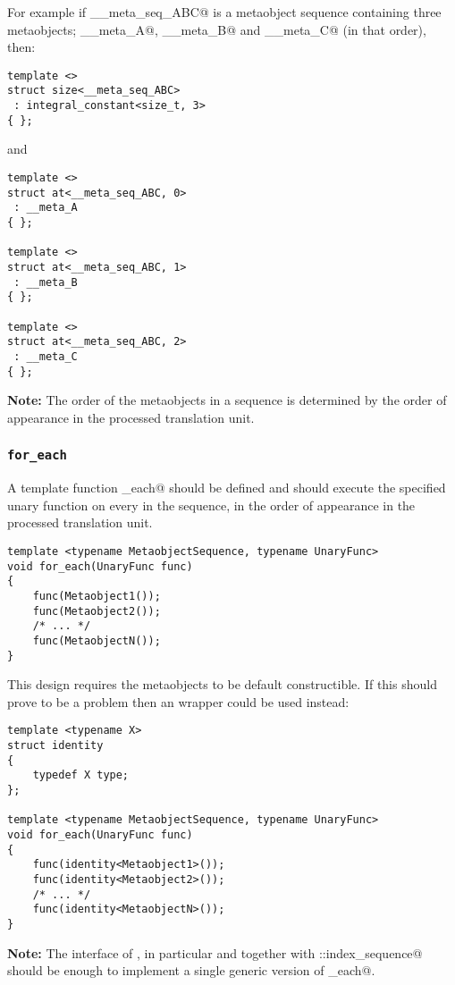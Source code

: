 For example if \verb@__meta_seq_ABC@ is a metaobject sequence containing three metaobjects;
\verb@__meta_A@, \verb@__meta_B@ and \verb@__meta_C@ (in that order), then:

\begin{verbatim}
template <>
struct size<__meta_seq_ABC>
 : integral_constant<size_t, 3>
{ };
\end{verbatim}

and 

\begin{verbatim}
template <>
struct at<__meta_seq_ABC, 0>
 : __meta_A
{ };

template <>
struct at<__meta_seq_ABC, 1>
 : __meta_B
{ };

template <>
struct at<__meta_seq_ABC, 2>
 : __meta_C
{ };
\end{verbatim}

\textbf{Note:} The order of the metaobjects in a sequence is determined by the order
of appearance in the processed translation unit.

\subsubsection{\texttt{for\_each}}

A template function \verb@for_each@ should be defined and should
execute the specified unary function on every  in
the sequence, in the order of appearance in the processed translation unit.

\begin{verbatim}
template <typename MetaobjectSequence, typename UnaryFunc>
void for_each(UnaryFunc func)
{
	func(Metaobject1());
	func(Metaobject2());
	/* ... */
	func(MetaobjectN());
}

\end{verbatim}

This design requires the metaobjects to be default constructible.
If this should prove to be a problem then an \verb@identity@ wrapper could be used
instead:

\begin{verbatim}
template <typename X>
struct identity
{
	typedef X type;
};

template <typename MetaobjectSequence, typename UnaryFunc>
void for_each(UnaryFunc func)
{
	func(identity<Metaobject1>());
	func(identity<Metaobject2>());
	/* ... */
	func(identity<MetaobjectN>());
}

\end{verbatim}

\textbf{Note:} The interface of , in particular \verb@size@
and \verb@at@ together with \verb@std::index_sequence@ should be enough
to implement a single generic version of \verb@for_each@.

